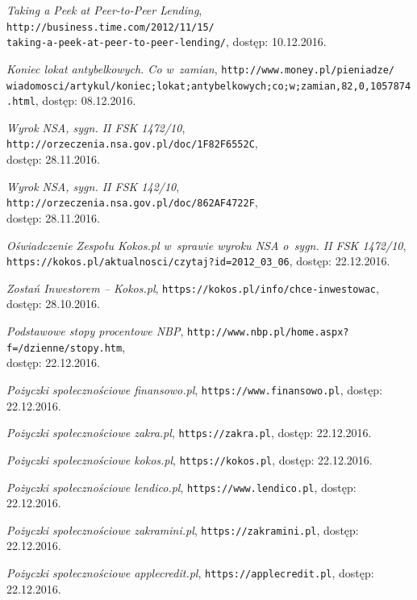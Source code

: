 \documentclass[a4paper,twoside,titlepage,openright]{book}
\begin{document}
\begin{thebibliography}{99}
 \textit{Taking a Peek at Peer-to-Peer Lending}, 
\texttt{http://business.time.com/2012/11/15/\\taking-a-peek-at-peer-to-peer-lending/}, dostęp: 10.12.2016.

 \textit{Koniec lokat antybelkowych. Co w~zamian}, 
\texttt{http://www.money.pl/pieniadze/\\wiadomosci/artykul/koniec;lokat;antybelkowych;co;w;zamian,82,0,1057874.html}, dostęp: 08.12.2016.

 \textit{Wyrok NSA, sygn. II FSK 1472/10}, \texttt{http://orzeczenia.nsa.gov.pl/doc/1F82F6552C}, \\dostęp: 28.11.2016.

 \textit{Wyrok NSA, sygn. II FSK 142/10}, 
\texttt{http://orzeczenia.nsa.gov.pl/doc/862AF4722F}, \\dostęp: 28.11.2016.

 \textit{Oświadczenie Zespołu Kokos.pl w~sprawie wyroku NSA o~sygn. II FSK 1472/10}, \\
\texttt{https://kokos.pl/aktualnosci/czytaj?id=2012\_03\_06}, dostęp: 22.12.2016.

 \textit{Zostań Inwestorem -- Kokos.pl}, 
\texttt{https://kokos.pl/info/chce-inwestowac}, \\dostęp: 28.10.2016.

 \textit{Podstawowe stopy procentowe NBP}, 
\texttt{http://www.nbp.pl/home.aspx?f=/dzienne/stopy.htm}, \\dostęp: 22.12.2016.

 \textit{Pożyczki społecznościowe finansowo.pl}, 
\texttt{https://www.finansowo.pl}, dostęp: 22.12.2016.

 \textit{Pożyczki społecznościowe zakra.pl}, 
\texttt{https://zakra.pl}, dostęp: 22.12.2016.

 \textit{Pożyczki społecznościowe kokos.pl}, 
\texttt{https://kokos.pl}, dostęp: 22.12.2016.

 \textit{Pożyczki społecznościowe lendico.pl}, 
\texttt{https://www.lendico.pl}, dostęp: 22.12.2016.

 \textit{Pożyczki społecznościowe zakramini.pl}, 
\texttt{https://zakramini.pl}, dostęp: 22.12.2016.

 \textit{Pożyczki społecznościowe applecredit.pl}, 
\texttt{https://applecredit.pl}, dostęp: 22.12.2016.


\end{thebibliography}
\end{document}
